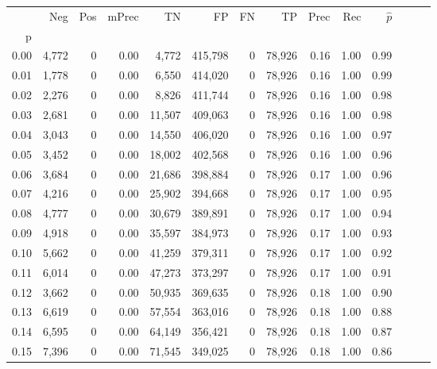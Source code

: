 \begin{tabular}{rrrrrrrrrrrrrr}
\toprule
{} &    Neg &    Pos & mPrec &       TN &       FP &      FN &      TP &  Prec &   Rec & $\hat{p}$ \\
p    &        &        &       &          &          &         &         &       &       &           \\
\midrule
0.00 &  4,772 &      0 &  0.00 &    4,772 &  415,798 &       0 &  78,926 &  0.16 &  1.00 &      0.99 \\
0.01 &  1,778 &      0 &  0.00 &    6,550 &  414,020 &       0 &  78,926 &  0.16 &  1.00 &      0.99 \\
0.02 &  2,276 &      0 &  0.00 &    8,826 &  411,744 &       0 &  78,926 &  0.16 &  1.00 &      0.98 \\
0.03 &  2,681 &      0 &  0.00 &   11,507 &  409,063 &       0 &  78,926 &  0.16 &  1.00 &      0.98 \\
0.04 &  3,043 &      0 &  0.00 &   14,550 &  406,020 &       0 &  78,926 &  0.16 &  1.00 &      0.97 \\
0.05 &  3,452 &      0 &  0.00 &   18,002 &  402,568 &       0 &  78,926 &  0.16 &  1.00 &      0.96 \\
0.06 &  3,684 &      0 &  0.00 &   21,686 &  398,884 &       0 &  78,926 &  0.17 &  1.00 &      0.96 \\
0.07 &  4,216 &      0 &  0.00 &   25,902 &  394,668 &       0 &  78,926 &  0.17 &  1.00 &      0.95 \\
0.08 &  4,777 &      0 &  0.00 &   30,679 &  389,891 &       0 &  78,926 &  0.17 &  1.00 &      0.94 \\
0.09 &  4,918 &      0 &  0.00 &   35,597 &  384,973 &       0 &  78,926 &  0.17 &  1.00 &      0.93 \\
0.10 &  5,662 &      0 &  0.00 &   41,259 &  379,311 &       0 &  78,926 &  0.17 &  1.00 &      0.92 \\
0.11 &  6,014 &      0 &  0.00 &   47,273 &  373,297 &       0 &  78,926 &  0.17 &  1.00 &      0.91 \\
0.12 &  3,662 &      0 &  0.00 &   50,935 &  369,635 &       0 &  78,926 &  0.18 &  1.00 &      0.90 \\
0.13 &  6,619 &      0 &  0.00 &   57,554 &  363,016 &       0 &  78,926 &  0.18 &  1.00 &      0.88 \\
0.14 &  6,595 &      0 &  0.00 &   64,149 &  356,421 &       0 &  78,926 &  0.18 &  1.00 &      0.87 \\
0.15 &  7,396 &      0 &  0.00 &   71,545 &  349,025 &       0 &  78,926 &  0.18 &  1.00 &      0.86 \\

\end{tabular}
